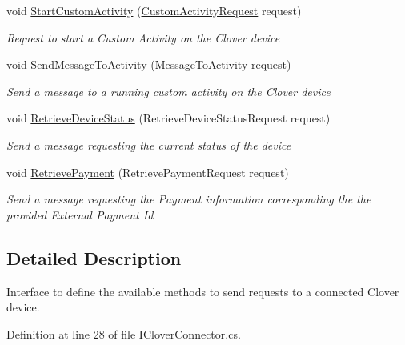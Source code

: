 \begin{DoxyCompactItemize}
void \hyperlink{interfacecom_1_1clover_1_1remotepay_1_1sdk_1_1_i_clover_connector_a3ec58f5860c34bcb104578caddb0b564}{Start\+Custom\+Activity} (\hyperlink{classcom_1_1clover_1_1remotepay_1_1sdk_1_1_custom_activity_request}{Custom\+Activity\+Request} request)
\begin{DoxyCompactList}\small\item\em Request to start a Custom Activity on the Clover device \end{DoxyCompactList}\item 
void \hyperlink{interfacecom_1_1clover_1_1remotepay_1_1sdk_1_1_i_clover_connector_ad6e241f6dac22bafa5edcc89457c99a7}{Send\+Message\+To\+Activity} (\hyperlink{classcom_1_1clover_1_1remotepay_1_1sdk_1_1_message_to_activity}{Message\+To\+Activity} request)
\begin{DoxyCompactList}\small\item\em Send a message to a running custom activity on the Clover device \end{DoxyCompactList}\item 
void \hyperlink{interfacecom_1_1clover_1_1remotepay_1_1sdk_1_1_i_clover_connector_a172b1a191a58f1f0e4dcc0a8dc7eae48}{Retrieve\+Device\+Status} (Retrieve\+Device\+Status\+Request request)
\begin{DoxyCompactList}\small\item\em Send a message requesting the current status of the device \end{DoxyCompactList}\item 
void \hyperlink{interfacecom_1_1clover_1_1remotepay_1_1sdk_1_1_i_clover_connector_a3b85cfdb92b7c64d9b27decc49ca8b7c}{Retrieve\+Payment} (Retrieve\+Payment\+Request request)
\begin{DoxyCompactList}\small\item\em Send a message requesting the Payment information corresponding the the provided External Payment Id \end{DoxyCompactList}\end{DoxyCompactItemize}


\subsection{Detailed Description}
Interface to define the available methods to send requests to a connected Clover device. 



Definition at line 28 of file I\+Clover\+Connector.\+cs.



